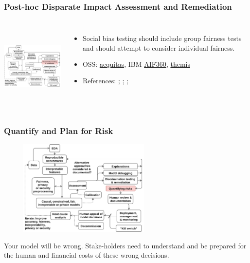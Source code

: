 \documentclass[11pt,
               aspectratio=169,
               hyperref={colorlinks}
               ]{beamer}
\begin{document}
			\begin{frame}		
			
				\frametitle{Post-hoc Disparate Impact Assessment and Remediation}		
				
				\begin{columns}
		
					\centering
					\includegraphics[height=120pt]{../img/fair.png}
					
					\vspace{-5pt}
					\begin{itemize}
						\item Social bias testing should include group fairness tests and should attempt to consider individual fairness. 
						\item OSS: \href{https://github.com/dssg/aequitas}{aequitas}, IBM \href{https://github.com/IBM/AIF360}{AIF360}, \href{https://github.com/LASER-UMASS/Themis}{themis}
						\item References: ; ; ;  
					\end{itemize}
					
				\end{columns}
			
			\end{frame}
	
			\begin{frame}
			
				\frametitle{Quantify and Plan for Risk}	
				
				\begin{figure}[htb]
					\begin{center}
						\includegraphics[height=135pt]{../img/risk.png}
						\end{center}
					\end{figure}	
	
				\vspace{-10pt}
				\scriptsize{Your model will be wrong. Stake-holders need to understand and be prepared for the human and financial costs of these wrong decisions.}	
					
			\end{frame}
	
\end{document}
